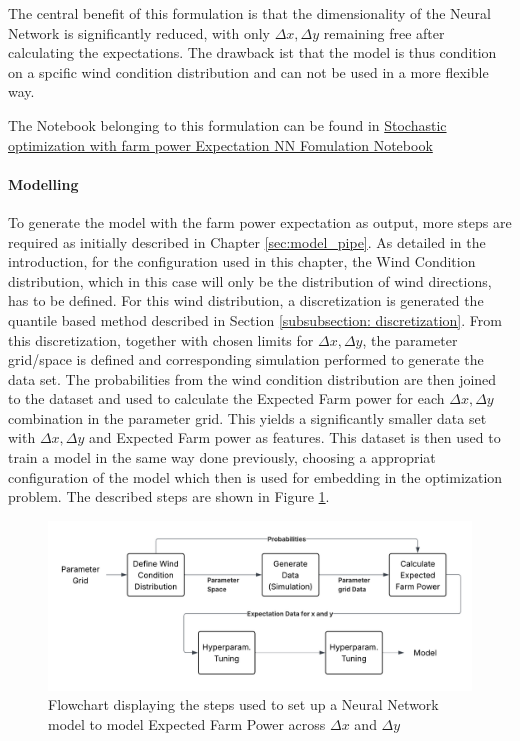 \documentclass[preprint,12pt]{elsarticle}
\begin{document}
The central benefit of this formulation is that the dimensionality of the Neural Network is significantly reduced, with only  \(\Delta x, \Delta y\) remaining free after calculating the expectations. The drawback ist that the model is thus condition on a spcific wind condition distribution and can not be used in a more flexible way.


The Notebook belonging to this formulation can be found in \href{https://github.com/schmeti/uc3m_TFM_wind_farm_optimization_codebase/blob/main/Windfarm_power_modelling/0_two_turbine_problem_constrLearn_probweightedt_expNN.ipynb}{Stochastic optimization with farm power Expectation NN Fomulation Notebook} \cite{schmetz2025twoturbine_stoch2}

\paragraph{Modelling}

To generate the model with the farm power expectation as output, more steps are required as initially described in Chapter \ref{sec:model_pipe}. As detailed in the introduction, for the configuration used in this chapter, the Wind Condition distribution, which in this case will only be the distribution of wind directions, has to be defined. For this wind distribution, a discretization is generated the quantile based method described in Section \ref{subsubsection: discretization}. From this discretization, together with chosen limits for \(\Delta x, \Delta y\), the parameter grid/space is defined and corresponding simulation performed to generate the data set. The probabilities from the wind condition distribution are then joined to the dataset and used to calculate the Expected Farm power for each \(\Delta x, \Delta y\) combination in the parameter grid. This yields a significantly smaller data set with \(\Delta x, \Delta y\) and Expected Farm power as features. This dataset is then used to train a model in the same way done previously, choosing a appropriat configuration of the model which then is used for embedding in the optimization problem. The described steps are shown in Figure \ref{fig:stoch2_model_flow}.


\begin{figure}[h] 
	\centering
	\includegraphics[width=1\textwidth]{../figures/optimization/stoch2/stoch2_model_flow.png} 
	\caption{Flowchart displaying the steps used to set up a Neural Network model to model Expected Farm Power across \(\Delta x\) and  \(\Delta y\)}
	\label{fig:stoch2_model_flow}
\end{figure} 
\end{document}
